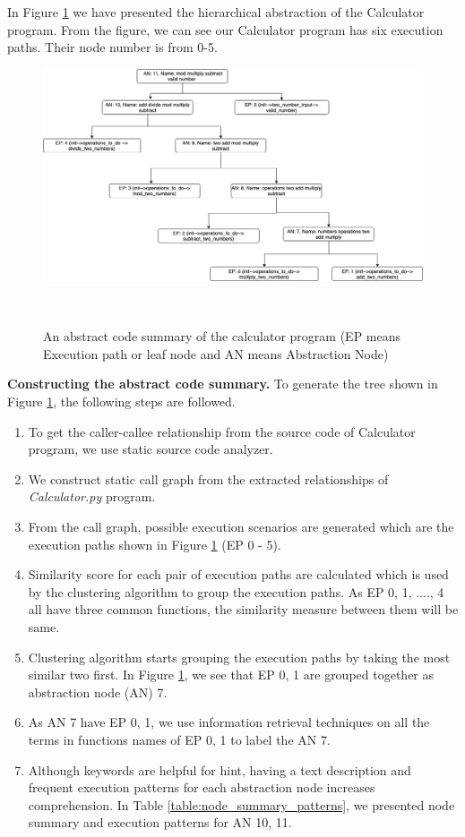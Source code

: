 In Figure \ref{fig:motivation} we have presented the hierarchical abstraction of the Calculator program. From the figure, we can see our Calculator program has six execution paths. Their node number is from 0-5. 

\begin{figure}[h]
  \centering
  \includegraphics[width=\columnwidth]{figures/hla2/hla2_motivation.png}
  \caption{An abstract code summary of the calculator program (EP means Execution path or leaf node and AN means Abstraction Node)}~\label{fig:motivation}
\end{figure}

\textbf{Constructing the abstract code summary.} To generate the tree shown in Figure \ref{fig:motivation}, the following steps are followed.

\begin{enumerate}
    \item To get the caller-callee relationship from the source code of Calculator program, we use static source code analyzer.
    \item We construct static call graph from the extracted relationships of \emph{Calculator.py} program. 
    \item From the call graph, possible execution scenarios are generated  which are the execution paths shown in Figure \ref{fig:motivation} (EP 0 - 5).
    \item Similarity score for each pair of execution paths are calculated which is used by the clustering algorithm to group the execution paths. As EP 0, 1, ...., 4 all have three common functions, the similarity measure between them  will be same.  
    \item Clustering algorithm starts grouping the execution paths by taking the most similar two first. In Figure \ref{fig:motivation}, we see that EP 0, 1 are grouped together as abstraction node (AN) 7.
    \item As AN 7 have EP 0, 1, we use information retrieval techniques on all the terms in functions names of EP 0, 1 to label the AN 7. 
    \item Although keywords are helpful for hint, having a text description and frequent execution patterns for each abstraction node increases comprehension. In Table \ref{table:node_summary_patterns}, we presented node summary and execution patterns for AN 10, 11. 
    
\end{enumerate}



